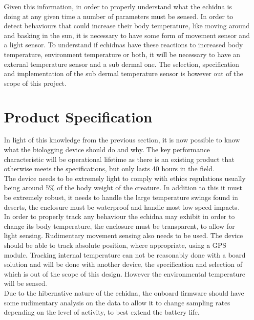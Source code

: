 \documentclass[12pt,openany,a4paper]{book}
\begin{document}
	Given this information, in order to properly understand what the echidna is doing at any given time a number of parameters must be sensed. In order to detect behaviours that could increase their body temperature, like moving around and basking in the sun, it is necessary to have some form of movement sensor and a light sensor. To understand if echidnas have these reactions to increased body temperature, environment temperature or both, it will be necessary to have an external temperature sensor and a sub dermal one. The selection, specification and implementation of the sub dermal temperature sensor is however out of the scope of this project.
	
	\section{Product Specification}
	In light of this knowledge from the previous section, it is now possible to know what the biologging device should do and why. The key performance characteristic will be operational lifetime as there is an existing product \cite{Freakley13} that otherwise meets the specifications, but only lasts 40 hours in the field. \\
	
	The device needs to be extremely light to comply with ethics regulations \cite{Mamm87} usually being around 5\% of the body weight of the creature. In addition to this it must be extremely robust, it needs to handle the large temperature swings found in deserts, the enclosure must be waterproof and handle most low speed impacts. \\
	
	In order to properly track any behaviour the echidna may exhibit in order to change its body temperature, the enclosure must be transparent, to allow for light sensing. Rudimentary movement sensing also needs to be used. The device should be able to track absolute position, where appropriate, using a GPS module. Tracking internal temperature can not be reasonably done with a board solution and will be done with another device, the specification and selection of which is out of the scope of this design. However the environmental temperature will be sensed. \\
	
	Due to the hibernative nature of the echidna, the onboard firmware should have some rudimentary analysis on the data to allow it to change sampling rates depending on the level of activity, to best extend the battery life. \\
	
\end{document}
